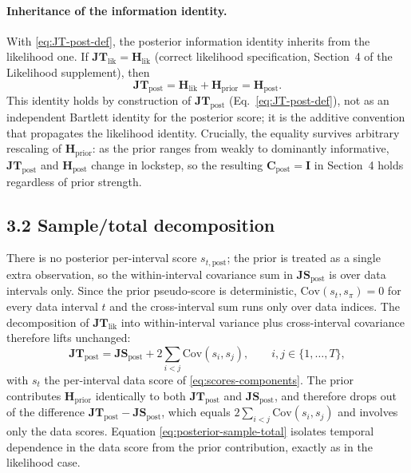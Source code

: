 \documentclass[11pt]{article}
\begin{document}
\paragraph{Inheritance of the information identity.}
With \eqref{eq:JT-post-def}, the posterior information identity inherits from the likelihood one. If $\mathbf{JT}_{\mathrm{lik}} = \mathbf H_{\mathrm{lik}}$ (correct likelihood specification, Section~4 of the Likelihood supplement), then
\begin{equation}
\mathbf{JT}_{\mathrm{post}}
=
\mathbf H_{\mathrm{lik}} + \mathbf H_{\mathrm{prior}}
=
\mathbf H_{\mathrm{post}}.
\label{eq:posterior-info-identity}
\end{equation}
This identity holds by construction of $\mathbf{JT}_{\mathrm{post}}$ (Eq.~\eqref{eq:JT-post-def}), not as an independent Bartlett identity for the posterior score; it is the additive convention that propagates the likelihood identity. Crucially, the equality survives arbitrary rescaling of $\mathbf H_{\mathrm{prior}}$: as the prior ranges from weakly to dominantly informative, $\mathbf{JT}_{\mathrm{post}}$ and $\mathbf H_{\mathrm{post}}$ change in lockstep, so the resulting $\mathbf C_{\mathrm{post}} = \mathbf I$ in Section~4 holds regardless of prior strength.

\subsection*{3.2 Sample/total decomposition}

There is no posterior per-interval score $s_{t,\mathrm{post}}$; the prior is treated as a single extra observation, so the within-interval covariance sum in $\mathbf{JS}_{\mathrm{post}}$ is over data intervals only. Since the prior pseudo-score is deterministic, $\mathrm{Cov}(s_t, s_\pi) = 0$ for every data interval $t$ and the cross-interval sum runs only over data indices. The decomposition of $\mathbf{JT}_{\mathrm{lik}}$ into within-interval variance plus cross-interval covariance therefore lifts unchanged:
\begin{equation}
\mathbf{JT}_{\mathrm{post}}
=
\mathbf{JS}_{\mathrm{post}}
+
2\sum_{i<j}\mathrm{Cov}(s_i, s_j),
\qquad i,j \in \{1,\ldots,T\},
\label{eq:posterior-sample-total}
\end{equation}
with $s_t$ the per-interval data score of \eqref{eq:scores-components}. The prior contributes $\mathbf H_{\mathrm{prior}}$ identically to both $\mathbf{JT}_{\mathrm{post}}$ and $\mathbf{JS}_{\mathrm{post}}$, and therefore drops out of the difference $\mathbf{JT}_{\mathrm{post}} - \mathbf{JS}_{\mathrm{post}}$, which equals $2\sum_{i<j}\mathrm{Cov}(s_i, s_j)$ and involves only the data scores. Equation \eqref{eq:posterior-sample-total} isolates temporal dependence in the data score from the prior contribution, exactly as in the likelihood case.
\end{document}
